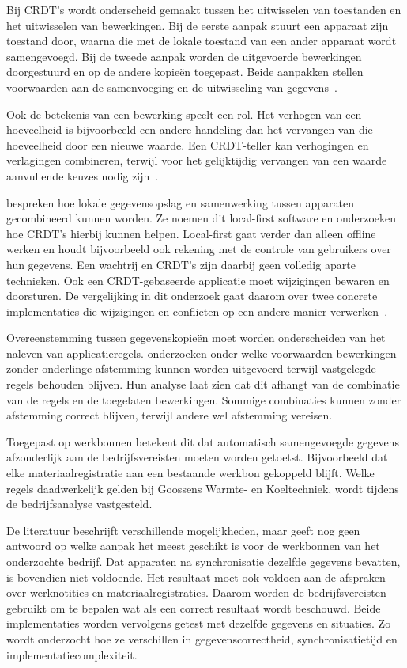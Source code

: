 Bij CRDT's wordt onderscheid gemaakt tussen het uitwisselen van toestanden en het uitwisselen van bewerkingen. Bij de eerste aanpak
stuurt een apparaat zijn toestand door, waarna die met de lokale toestand van een ander apparaat wordt samengevoegd. Bij de tweede 
aanpak worden de uitgevoerde bewerkingen doorgestuurd en op de andere kopieën toegepast. Beide aanpakken stellen voorwaarden aan de
samenvoeging en de uitwisseling van gegevens~\autocite{PreguicaEtAl2018}.

Ook de betekenis van een bewerking speelt een rol. Het verhogen van een hoeveelheid is bijvoorbeeld een andere handeling dan het vervangen 
van die hoeveelheid door een nieuwe waarde. Een CRDT-teller kan verhogingen en verlagingen combineren, terwijl voor het gelijktijdig
vervangen van een waarde aanvullende keuzes nodig zijn~\autocite{PreguicaEtAl2018}.

\textcite{KleppmannEtAl2019} bespreken hoe lokale gegevensopslag en samenwerking tussen apparaten gecombineerd kunnen worden.
Ze noemen dit local-first software en onderzoeken hoe CRDT's hierbij kunnen helpen. Local-first gaat verder dan
alleen offline werken en houdt bijvoorbeeld ook rekening met de controle van gebruikers over hun gegevens.
Een wachtrij en CRDT's zijn daarbij geen volledig
aparte technieken. Ook een CRDT-gebaseerde applicatie moet wijzigingen bewaren en doorsturen. De vergelijking in dit onderzoek
gaat daarom over twee concrete implementaties die wijzigingen en conflicten op een andere manier
verwerken~\autocite{PreguicaEtAl2018}.

Overeenstemming tussen gegevenskopieën moet worden onderscheiden van het naleven van applicatieregels. \textcite{BailisEtAl2014} onderzoeken
onder welke voorwaarden bewerkingen zonder onderlinge afstemming kunnen worden uitgevoerd terwijl vastgelegde regels behouden blijven.
Hun analyse laat zien dat dit afhangt van de combinatie van de regels en de toegelaten bewerkingen. Sommige combinaties kunnen zonder
afstemming correct blijven, terwijl andere wel afstemming vereisen.

Toegepast op werkbonnen betekent dit dat automatisch samengevoegde gegevens afzonderlijk aan de bedrijfsvereisten moeten worden getoetst.
Bijvoorbeeld dat elke materiaalregistratie aan een bestaande werkbon gekoppeld blijft. Welke regels daadwerkelijk
gelden bij Goossens Warmte- en Koeltechniek, wordt tijdens de
bedrijfsanalyse vastgesteld.

De literatuur beschrijft verschillende mogelijkheden, maar geeft nog geen antwoord op welke aanpak het meest geschikt is
voor de werkbonnen van het onderzochte bedrijf. Dat apparaten na synchronisatie dezelfde gegevens bevatten, is bovendien niet
voldoende. Het resultaat moet ook voldoen aan de afspraken over werknotities en materiaalregistraties. Daarom worden de
bedrijfsvereisten gebruikt om te bepalen wat als een correct resultaat wordt beschouwd. Beide implementaties worden vervolgens
getest met dezelfde gegevens en situaties. Zo wordt onderzocht hoe ze verschillen in gegevenscorrectheid, synchronisatietijd
en implementatiecomplexiteit.

